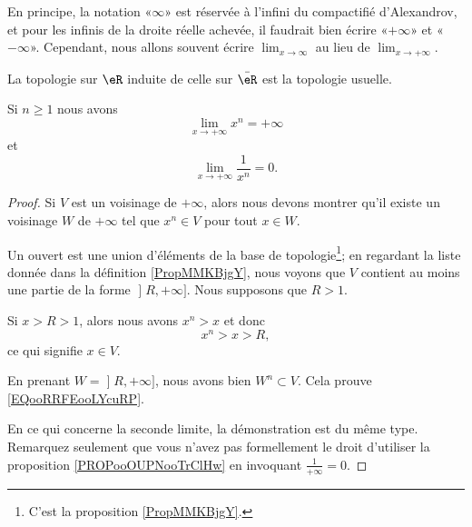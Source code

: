 \begin{normaltext}
    En principe, la notation «\( \infty\)» est réservée à l'infini du compactifié d'Alexandrov, et pour les infinis de la droite réelle achevée, il faudrait bien écrire «\( +\infty\)» et «\( -\infty\)». Cependant, nous allons souvent écrire \( \lim_{x\to \infty} \) au lieu de \( \lim_{x\to +\infty} \).
\end{normaltext}

\begin{lemma}
    La topologie sur \( \eR\) induite de celle sur \( \bar \eR\) est la topologie usuelle.
\end{lemma}

\begin{lemma}       \label{LEMooFCIXooJuHFqk}
    Si \( n\geq 1\) nous avons 
    \begin{equation}        \label{EQooRRFEooLYcuRP}
        \lim_{x\to +\infty} x^n = +\infty
    \end{equation}
    et
    \begin{equation}
        \lim_{x\to +\infty} \frac{1}{ x^n }=0.
    \end{equation}
\end{lemma}

\begin{proof}
    Si \( V\) est un voisinage de \( +\infty\), alors nous devons montrer qu'il existe un voisinage \( W\) de \( +\infty\) tel que \( x^n\in V\) pour tout \( x\in W\).   

    Un ouvert est une union d'éléments de la base de topologie\footnote{C'est la proposition \ref{PropMMKBjgY}.}; en regardant la liste donnée dans la définition \ref{PropMMKBjgY}, nous voyons que \( V\) contient au moins une partie de la forme \( \mathopen] R , +\infty \mathclose]\). Nous supposons que \( R>1\).

    Si \( x>R>1\), alors nous avons \( x^n>x\) et donc
    \begin{equation}
        x^n> x>R,
    \end{equation}
    ce qui signifie \( x\in V\).

    En prenant \( W=\mathopen] R , +\infty \mathclose]\), nous avons bien \( W^n\subset V\). Cela prouve \eqref{EQooRRFEooLYcuRP}.

    En ce qui concerne la seconde limite, la démonstration est du même type. Remarquez seulement que vous n'avez pas formellement le droit d'utiliser la proposition \ref{PROPooOUPNooTrClHw} en invoquant \( \frac{1}{ +\infty }=0\).
\end{proof}

